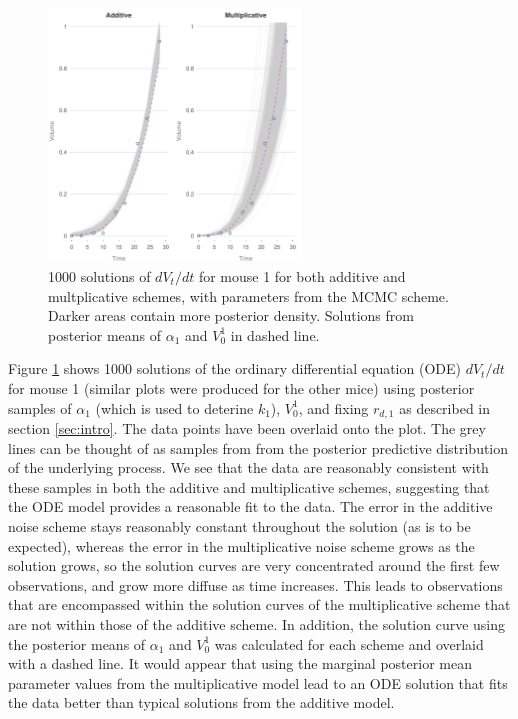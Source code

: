 \documentclass[11pt,a4paper]{article}
\begin{document}
\begin{figure}
\centering
\includegraphics[width=0.6\textwidth]{SolsMouse1withMean.pdf}
\caption{1000 solutions of $dV_t/dt$ for mouse 1 for both additive and multplicative schemes, with parameters from the MCMC scheme. Darker areas contain more posterior density. Solutions from posterior means of $\alpha_1$ and $V_0^1$ in dashed line.}
\label{fig:solutions}
\end{figure}
Figure \ref{fig:solutions} shows 1000 solutions of the ordinary differential equation (ODE) $dV_t/dt$ for mouse 1 (similar plots were produced for the other mice) using posterior samples of $\alpha_1$ (which is used to deterine $k_1$), $V_0^1$, and fixing $r_{d,1}$ as described in section \ref{sec:intro}. The data points have been overlaid onto the plot. The grey lines can be thought of as samples from from the posterior predictive distribution of the underlying process. We see that the data are reasonably consistent with these samples in both the additive and multiplicative schemes, suggesting that the ODE model provides a reasonable fit to the data. The error in the additive noise scheme stays reasonably constant throughout the solution (as is to be expected), whereas the error in the multiplicative noise scheme grows as the solution grows, so the solution curves are very concentrated around the first few observations, and grow more diffuse as time increases. This leads to observations that are encompassed within the solution curves of the multiplicative scheme that are not within those of the additive scheme. In addition, the solution curve using the posterior means of $\alpha_1$ and $V_0^1$ was calculated for each scheme and overlaid with a dashed line. It would appear that using the marginal posterior mean parameter values from the multiplicative model lead to an ODE solution that fits the data better than typical solutions from the additive model.
\end{document}
